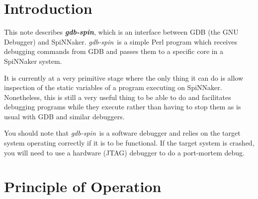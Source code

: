 %
%
%

\def\FullTitle{\textsl{gdb-spin} - GDB SpiNNaker Interface}
\def\ShortTitle{\textsl{gdb-spin}}
\def\Date{8 Mar 2016}
\def\Version{2.0.0}
\def\Author{Steve Temple}
\def\Email{steven.temple@manchester.ac.uk}




\newcommand{\gdbspin}{\textsl{gdb-spin}}

\section{Introduction}

This note describes \textbf{\gdbspin}, which is an interface between
GDB (the GNU Debugger) and SpiNNaker. \gdbspin\ is a simple Perl
program which receives debugging commands from GDB and passes them to
a specific core in a SpiNNaker system.

It is currently at a very primitive stage where the only thing it can
do is allow inspection of the static variables of a program executing
on SpiNNaker. Nonetheless, this is still a very useful thing to be
able to do and facilitates debugging programs while they execute
rather than having to stop them as is usual with GDB and similar
debuggers.

You should note that \gdbspin\ is a software debugger and relies on
the target system operating correctly if it is to be functional. If
the target system is crashed, you will need to use a hardware (JTAG)
debugger to do a port-mortem debug.

\section{Principle of Operation}

